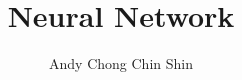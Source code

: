 \documentclass[12pt,twoside,a4paper]{report}
\title{Neural Network}
\author{Andy Chong Chin Shin}
\begin{document}
\titleGM

\tableofcontents












\end{document}
